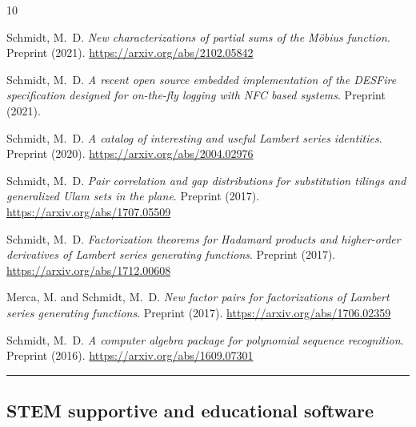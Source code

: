 \documentclass[10pt,reqno,letterpaper]{article}
\theoremstyle{plain}
\numberwithin{theorem}{section}
\theoremstyle{definition}
\newcounter{completeBibitemIncrementCtr}
\renewenvironment{thebibliography}[1]{
     \renewcommand{\refname}{} 
     
     \begin{oldthebibliography}{#1}
     \setlength{\itemsep}{0em}
     \setlength{\parskip}{0em}
     \setlength{\topsep}{0pt}
     \setlength{\partopsep}{0pt}
     \setcounter{enumiv}{\value{completeBibitemIncrementCtr}}
     \footnotesize 
}
{
     \setcounter{completeBibitemIncrementCtr}{\value{enumiv}}
     \end{oldthebibliography}
}
\begin{document}
\begin{thebibliography}{10}

Schmidt, M.~D. \emph{New characterizations of partial sums of the M\"{o}bius function}. 
Preprint (2021). 
\url{https://arxiv.org/abs/2102.05842}

\bibitem{}
Schmidt, M.~D. \emph{A recent open source embedded implementation of the DESFire specification 
                     designed for on-the-fly logging with NFC based systems}. Preprint (2021).

Schmidt, M.~D. \emph{A catalog of interesting and useful Lambert series identities}. 
Preprint (2020). 
\url{https://arxiv.org/abs/2004.02976} 

Schmidt, M.~D. \emph{Pair correlation and gap distributions for substitution tilings and 
                     generalized Ulam sets in the plane}. 
Preprint (2017). 
\url{https://arxiv.org/abs/1707.05509}


Schmidt, M.~D. \emph{Factorization theorems for Hadamard products and 
                     higher-order derivatives of Lambert series generating functions}. 
Preprint (2017). 
\url{https://arxiv.org/abs/1712.00608} 

Merca, M. and Schmidt, M.~D. \emph{New factor pairs for factorizations of Lambert series generating functions}. 
Preprint (2017). 
\url{https://arxiv.org/abs/1706.02359}

Schmidt, M.~D. \emph{A computer algebra package for polynomial sequence recognition}. 
Preprint (2016). 
\url{https://arxiv.org/abs/1609.07301}

\end{thebibliography}

\bigskip\hrule\bigskip
\subsection{STEM supportive and educational software}
\end{document}
